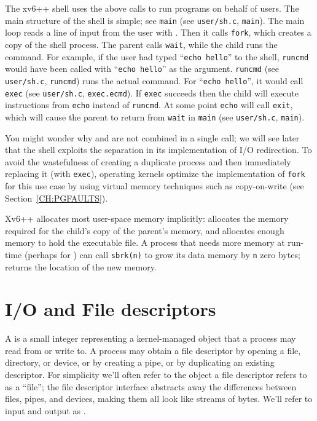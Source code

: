 The xv6++ shell uses the above calls to run programs on behalf of
users. The main structure of the shell is simple; see
\lstinline{main}
(see \texttt{user/sh.c}, \texttt{main}).
The main loop reads a line of input from the user with
.
Then it calls
\lstinline{fork},
which creates a copy of the shell process. The
parent calls
\lstinline{wait},
while the child runs the command.  For example, if the user
had typed
``\lstinline{echo hello}''
to the shell,
\lstinline{runcmd}
would have been called with
``\lstinline{echo hello}''
as the argument.
\lstinline{runcmd}
(see \texttt{user/sh.c}, \texttt{runcmd})
runs the actual command. For
``\lstinline{echo hello}'',
it would call
\lstinline{exec}
(see \texttt{user/sh.c}, \texttt{exec.ecmd}).
If
\lstinline{exec}
succeeds then the child will execute instructions from
\lstinline{echo}
instead of
\lstinline{runcmd}.
At some point
\lstinline{echo}
will call
\lstinline{exit},
which will cause the parent to return from
\lstinline{wait}
in
\lstinline{main}
(see \texttt{user/sh.c}, \texttt{main}).

You might wonder why
and
are not combined in a single call; we will see later that
the shell exploits the separation in its implementation of
I/O redirection.
To avoid the wastefulness of
creating a duplicate process and then immediately replacing it (with \lstinline{exec}),
operating kernels optimize the implementation of
\lstinline{fork}
for this use case by using virtual memory techniques such as
copy-on-write (see Section~\ref{CH:PGFAULTS}).

Xv6++ allocates most user-space memory
implicitly:
allocates the memory required for the child's copy of the
parent's memory, and
allocates enough memory to hold the executable file.
A process that needs more memory at run-time (perhaps for
)
can call
\lstinline{sbrk(n)}
to grow its data memory by
\lstinline{n} zero
bytes;
returns the location of the new memory.

\section{I/O and File descriptors}

A
is a small integer representing a kernel-managed object
that a process may read from or write to.
A process may obtain a file descriptor by opening a file, directory,
or device, or by creating a pipe, or by duplicating an existing
descriptor.
For simplicity we'll often refer to the object a file descriptor
refers to as a ``file'';
the file descriptor interface abstracts away the differences between
files, pipes, and devices, making them all look like streams of bytes.
We'll refer to input and output as .

